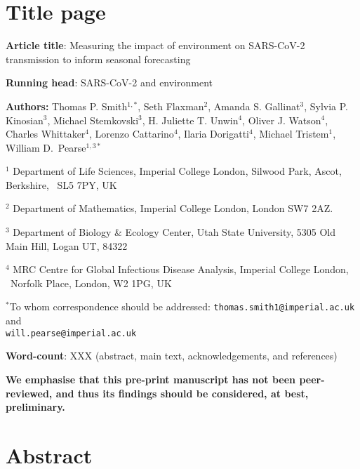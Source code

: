 \documentclass[12pt,english,a4paper]{article}
\begin{document}
\setlength{\parindent}{0pt}

\section*{Title page}

\textbf{Article title}: Measuring the impact of environment on SARS-CoV-2 transmission to inform seasonal forecasting


\textbf{Running head}: SARS-CoV-2 and environment

\textbf{Authors:} Thomas P. Smith$^{1,*}$,
Seth Flaxman$^2$, Amanda S. Gallinat$^3$, Sylvia P. Kinosian$^3$, Michael Stemkovski$^3$,
H. Juliette T. Unwin$^4$,
Oliver J. Watson$^4$, Charles Whittaker$^4$,
Lorenzo Cattarino$^4$, Ilaria Dorigatti$^4$, Michael Tristem$^1$,
William D.\ Pearse$^{1,3*}$

$^1$ Department of Life Sciences, Imperial College London, Silwood Park, Ascot, Berkshire, \
 SL5 7PY, UK
 
$^2$ Department of Mathematics, Imperial College London, London SW7 2AZ.

$^3$ Department of Biology \& Ecology Center, Utah State University,
5305 Old Main Hill, Logan UT, 84322

$^4$ MRC Centre for Global Infectious Disease Analysis, Imperial College London, \ 
Norfolk Place, London, W2 1PG, UK 

$^*$To whom correspondence should be addressed:
\texttt{thomas.smith1@imperial.ac.uk} and \\
\texttt{will.pearse@imperial.ac.uk}

\textbf{Word-count}: XXX (abstract, main text, acknowledgements, and references)

\textbf{We emphasise that this pre-print manuscript has not been peer-reviewed, and thus its findings should be considered, at best, preliminary.}

\clearpage
\section*{Abstract} %
\end{document}
